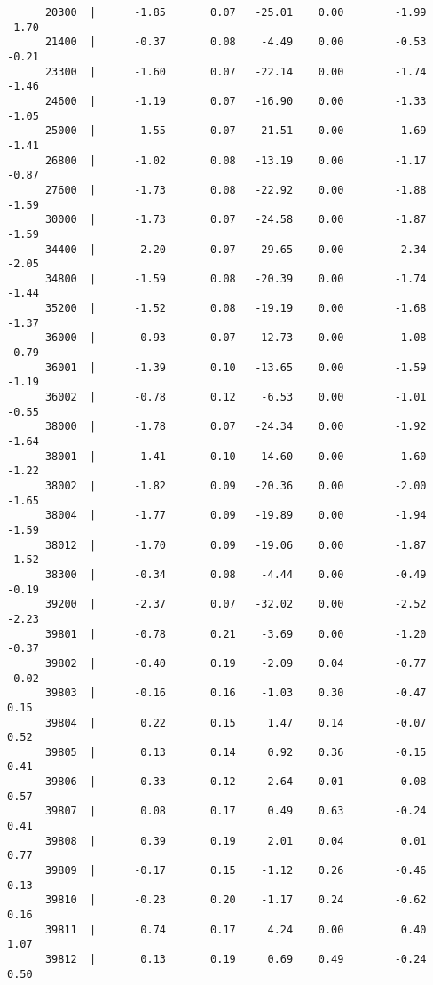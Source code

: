 \documentclass[10pt, letterpaper]{article}
\begin{document}
\begin{spacing}{1.4}
\begin{spacing}{.5}
\begin{scriptsize}
\begin{verbatim}
      20300  |      -1.85       0.07   -25.01    0.00        -1.99       -1.70
      21400  |      -0.37       0.08    -4.49    0.00        -0.53       -0.21
      23300  |      -1.60       0.07   -22.14    0.00        -1.74       -1.46
      24600  |      -1.19       0.07   -16.90    0.00        -1.33       -1.05
      25000  |      -1.55       0.07   -21.51    0.00        -1.69       -1.41
      26800  |      -1.02       0.08   -13.19    0.00        -1.17       -0.87
      27600  |      -1.73       0.08   -22.92    0.00        -1.88       -1.59
      30000  |      -1.73       0.07   -24.58    0.00        -1.87       -1.59
      34400  |      -2.20       0.07   -29.65    0.00        -2.34       -2.05
      34800  |      -1.59       0.08   -20.39    0.00        -1.74       -1.44
      35200  |      -1.52       0.08   -19.19    0.00        -1.68       -1.37
      36000  |      -0.93       0.07   -12.73    0.00        -1.08       -0.79
      36001  |      -1.39       0.10   -13.65    0.00        -1.59       -1.19
      36002  |      -0.78       0.12    -6.53    0.00        -1.01       -0.55
      38000  |      -1.78       0.07   -24.34    0.00        -1.92       -1.64
      38001  |      -1.41       0.10   -14.60    0.00        -1.60       -1.22
      38002  |      -1.82       0.09   -20.36    0.00        -2.00       -1.65
      38004  |      -1.77       0.09   -19.89    0.00        -1.94       -1.59
      38012  |      -1.70       0.09   -19.06    0.00        -1.87       -1.52
      38300  |      -0.34       0.08    -4.44    0.00        -0.49       -0.19
      39200  |      -2.37       0.07   -32.02    0.00        -2.52       -2.23
      39801  |      -0.78       0.21    -3.69    0.00        -1.20       -0.37
      39802  |      -0.40       0.19    -2.09    0.04        -0.77       -0.02
      39803  |      -0.16       0.16    -1.03    0.30        -0.47        0.15
      39804  |       0.22       0.15     1.47    0.14        -0.07        0.52
      39805  |       0.13       0.14     0.92    0.36        -0.15        0.41
      39806  |       0.33       0.12     2.64    0.01         0.08        0.57
      39807  |       0.08       0.17     0.49    0.63        -0.24        0.41
      39808  |       0.39       0.19     2.01    0.04         0.01        0.77
      39809  |      -0.17       0.15    -1.12    0.26        -0.46        0.13
      39810  |      -0.23       0.20    -1.17    0.24        -0.62        0.16
      39811  |       0.74       0.17     4.24    0.00         0.40        1.07
      39812  |       0.13       0.19     0.69    0.49        -0.24        0.50

\end{verbatim}
\end{scriptsize}
\end{spacing}
\end{spacing}
\end{document}
